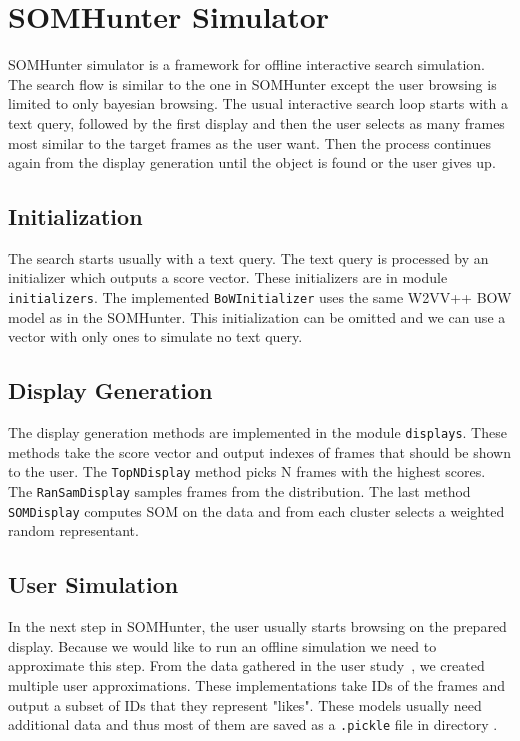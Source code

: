 \chapter{SOMHunter Simulator}
\label{somhunter-simulator}


SOMHunter simulator is a framework for offline interactive search simulation. The search flow is similar to the one in SOMHunter except the user browsing is limited to only bayesian browsing. The usual interactive search loop starts with a text query, followed by the first display and then the user selects as many frames most similar to the target frames as the user want. Then the process continues again from the display generation until the object is found or the user gives up.

\section{Initialization}

The search starts usually with a text query. The text query is processed by an initializer which outputs a score vector. These initializers are in module \lstinline{initializers}. The implemented \lstinline{BoWInitializer} uses the same W2VV++ BOW model as in the SOMHunter. This initialization can be omitted and we can use a vector with only ones to simulate no text query.

\section{Display Generation}

The display generation methods are implemented in the module \lstinline{displays}. These methods take the score vector and output indexes of frames that should be shown to the user. The \lstinline{TopNDisplay} method picks N frames with the highest scores. The \lstinline{RanSamDisplay} samples frames from the distribution. The last method \lstinline{SOMDisplay} computes SOM on the data and from each cluster selects a weighted random representant. 

\section{User Simulation}

In the next step in SOMHunter, the user usually starts browsing on the prepared display. Because we would like to run an offline simulation we need to approximate this step. From the data gathered in the user study~\cite{peska2021}, we created multiple user approximations. These implementations take IDs of the frames and output a subset of IDs that they represent "likes". These models usually need additional data and thus most of them are saved as a \lstinline{.pickle} file in directory .

